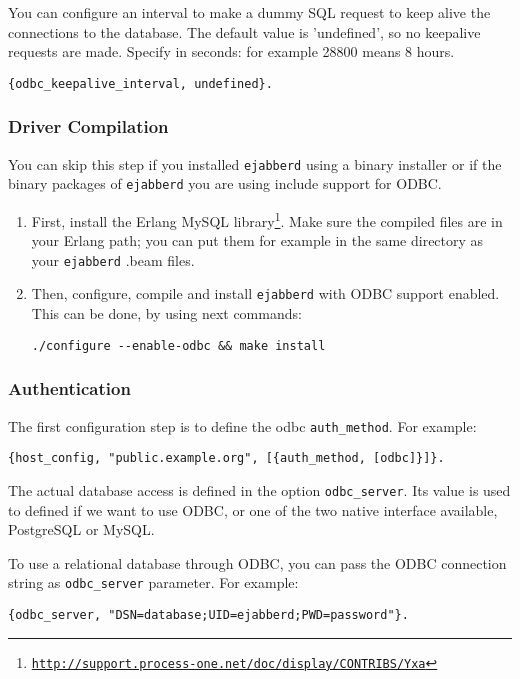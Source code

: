 \documentclass[a4paper,10pt]{book}
\newcommand{\ind}[1]{\begin{latexonly}\index{#1}\end{latexonly}}
\newcommand{\term}[1]{\texttt{#1}}
\newcommand{\ejabberd}{\texttt{ejabberd}}
\gdef\footahref#1#2{#2\footnote{\href{#1}{\texttt{#1}}}}
\begin{document}
You can configure an interval to make a dummy SQL request 
to keep alive the connections to the database. 
The default value is 'undefined', so no keepalive requests are made. 
Specify in seconds: for example 28800 means 8 hours.
\begin{verbatim}
{odbc_keepalive_interval, undefined}.
\end{verbatim}

\subsubsection{Driver Compilation}
\label{compileodbc}

You can skip this step if you installed \ejabberd{} using a binary installer or
if the binary packages of \ejabberd{} you are using include support for
ODBC.

\begin{enumerate}
\item First, install the \footahref{http://support.process-one.net/doc/display/CONTRIBS/Yxa}{Erlang
  MySQL library}. Make sure the compiled files are in your Erlang path; you can
  put them for example in the same directory as your \ejabberd{} .beam files.
\item Then, configure, compile and install \ejabberd{} with ODBC support
  enabled. This can be done, by using next commands:
  \begin{verbatim}
./configure --enable-odbc && make install
\end{verbatim}
\end{enumerate}

\subsubsection{Authentication}
\label{odbcauth}
\ind{ODBC!authentication}

The first configuration step is to define the odbc \term{auth\_method}. For
example:
\begin{verbatim}
{host_config, "public.example.org", [{auth_method, [odbc]}]}.
\end{verbatim}

The actual database access is defined in the option \term{odbc\_server}. Its
value is used to defined if we want to use ODBC, or one of the two native
interface available, PostgreSQL or MySQL.

To use a relational database through ODBC, you can pass the ODBC connection
string as \term{odbc\_server} parameter. For example:
\begin{verbatim}
{odbc_server, "DSN=database;UID=ejabberd;PWD=password"}.
\end{verbatim}
\end{document}
